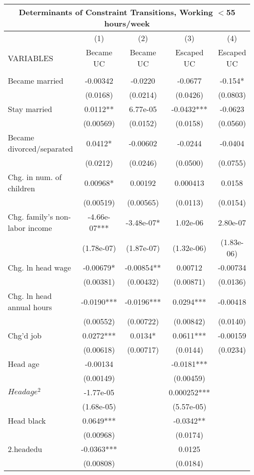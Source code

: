 \begin{tabular}{lcccc}
\multicolumn{5}{c}{Determinants of Constraint Transitions, Working $<$55 hours/week} \\ \hline
 & (1) & (2) & (3) & (4) \\
VARIABLES & Became UC & Became UC & Escaped UC & Escaped UC \\ \hline
 &  &  &  &  \\
Became married & -0.00342 & -0.0220 & -0.0677 & -0.154* \\
 & (0.0168) & (0.0214) & (0.0426) & (0.0803) \\
Stay married & 0.0112** & 6.77e-05 & -0.0432*** & -0.0623 \\
 & (0.00569) & (0.0152) & (0.0158) & (0.0560) \\
Became divorced/separated & 0.0412* & -0.00602 & -0.0244 & -0.0404 \\
 & (0.0212) & (0.0246) & (0.0500) & (0.0755) \\
Chg. in num. of children & 0.00968* & 0.00192 & 0.000413 & 0.0158 \\
 & (0.00519) & (0.00565) & (0.0113) & (0.0154) \\
Chg. family's non-labor income & -4.66e-07*** & -3.48e-07* & 1.02e-06 & 2.80e-07 \\
 & (1.78e-07) & (1.87e-07) & (1.32e-06) & (1.83e-06) \\
Chg. ln head wage & -0.00679* & -0.00854** & 0.00712 & -0.00734 \\
 & (0.00381) & (0.00432) & (0.00871) & (0.0136) \\
Chg. ln head annual hours & -0.0190*** & -0.0196*** & 0.0294*** & -0.00418 \\
 & (0.00552) & (0.00722) & (0.00842) & (0.0140) \\
Chg'd job & 0.0272*** & 0.0134* & 0.0611*** & -0.00159 \\
 & (0.00618) & (0.00717) & (0.0144) & (0.0234) \\
Head age & -0.00134 &  & -0.0181*** &  \\
 & (0.00149) &  & (0.00459) &  \\
$ Head age^2$ & -1.77e-05 &  & 0.000252*** &  \\
 & (1.68e-05) &  & (5.57e-05) &  \\
Head black & 0.0649*** &  & -0.0342** &  \\
 & (0.00968) &  & (0.0174) &  \\
2.headedu & -0.0363*** &  & 0.0125 &  \\
 & (0.00808) &  & (0.0184) &  \\

\end{tabular}
